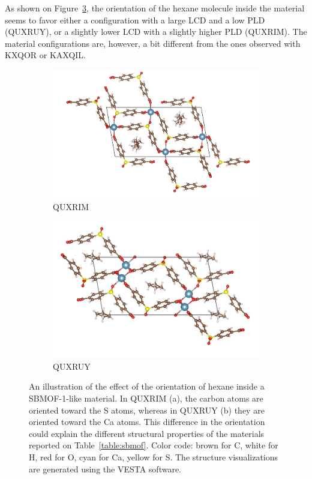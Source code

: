\documentclass[main]{subfiles}
\begin{document}
As shown on Figure~\ref{fgr:ads_config}, the orientation of the hexane molecule inside the material seems to favor either a configuration with a large LCD and a low PLD (QUXRUY), or a slightly lower LCD with a slightly higher PLD (QUXRIM). The material configurations are, however, a bit different from the ones observed with KXQOR or KAXQIL. 

\begin{figure}[ht]
  \centering
  \begin{subfigure}[b]{0.45\textwidth}
    \centering
    \includegraphics[height=0.6\textwidth]{figures/6-perspectives/QUXRIM.jpg}
    \caption{QUXRIM}\label{fgr:QUXRIM}
  \end{subfigure}
  \hfill
  \begin{subfigure}[b]{0.45\textwidth}
    \centering
    \includegraphics[height=0.6\textwidth]{figures/6-perspectives/QUXRUY.jpg}
    \caption{QUXRUY}\label{fgr:QUXRUY}
  \end{subfigure}
  \caption{ An illustration of the effect of the orientation of hexane inside a SBMOF-1-like material. In QUXRIM (a), the carbon atoms are oriented toward the S atoms, whereas in QUXRUY (b) they are oriented toward the Ca atoms. This difference in the orientation could explain the different structural properties of the materials reported on Table~\ref{table:sbmof}. Color code: brown for C, white for H, red for O, cyan for Ca, yellow for S. The structure visualizations are generated using the VESTA software.\autocite{VESTA}}\label{fgr:ads_config}
\end{figure}
\end{document}
